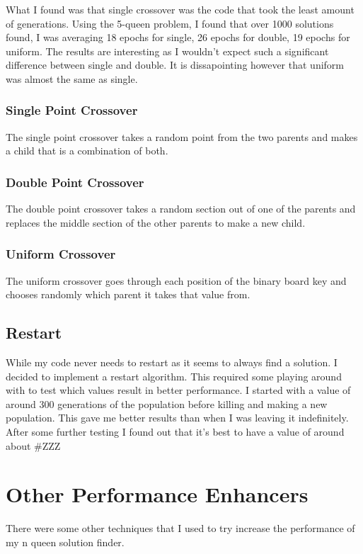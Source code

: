 \documentclass[a4paper,11pt]{article}
\begin{document}
What I found was that single crossover was the code that took the least amount of generations. Using the 5-queen problem, I found that over 1000 solutions found, I was averaging 18 epochs for single, 26 epochs for double, 19 epochs for uniform. The results are interesting as I wouldn't expect such a significant difference between single and double. It is dissapointing however that uniform was almost the same as single.

\subsubsection*{Single Point Crossover}
The single point crossover takes a random point from the two parents and makes a child that is a combination of both.


\subsubsection*{Double Point Crossover}
The double point crossover takes a random section out of one of the parents and replaces the middle section of the other parents to make a new child.


\subsubsection*{Uniform Crossover}
The uniform crossover goes through each position of the binary board key and chooses randomly which parent it takes that value from.


\subsection*{Restart}
While my code never needs to restart as it seems to always find a solution. I decided to implement a restart algorithm. This required some playing around with to test which values result in better performance.
I started with a value of around 300 generations of the population before killing and making a new population. This gave me better results than when I was leaving it indefinitely.
After some further testing I found out that it's best to have a value of around
about #ZZZ


\section*{Other Performance Enhancers}
There were some other techniques that I used to try increase the performance of my n queen solution finder.
\end{document}
